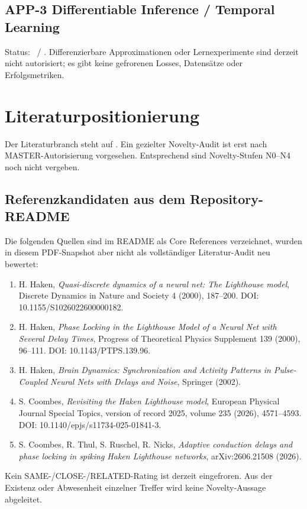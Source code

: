 \documentclass[11pt,a4paper]{article}
\newcommand{\status}[2]{\tcbox[on line,boxrule=0pt,arc=1.5pt,left=4pt,right=4pt,top=2pt,bottom=2pt,colback=#2!12,coltext=#2,fontupper=\bfseries\footnotesize]{#1}}
\newcommand{\WAIT}{\status{WAIT}{graydark}}
\newcommand{\PROTECTED}{\status{PROTECTED}{purple}}
\begin{document}
\subsection{APP-3 Differentiable Inference / Temporal Learning}
Status: \PROTECTED\ / \WAIT. Differenzierbare Approximationen oder Lernexperimente sind derzeit nicht autorisiert; es gibt keine gefrorenen Losses, Datensätze oder Erfolgsmetriken.

\section{Literaturpositionierung}

Der Literaturbranch steht auf \WAIT. Ein gezielter Novelty-Audit ist erst nach MASTER-Autorisierung vorgesehen. Entsprechend sind Novelty-Stufen N0--N4 noch nicht vergeben.

\subsection{Referenzkandidaten aus dem Repository-README}
Die folgenden Quellen sind im README als Core References verzeichnet, wurden in diesem PDF-Snapshot aber nicht als vollständiger Literatur-Audit neu bewertet:
\begin{enumerate}
\item H. Haken, \textit{Quasi-discrete dynamics of a neural net: The Lighthouse model}, Discrete Dynamics in Nature and Society 4 (2000), 187--200. DOI: 10.1155/S1026022600000182.
\item H. Haken, \textit{Phase Locking in the Lighthouse Model of a Neural Net with Several Delay Times}, Progress of Theoretical Physics Supplement 139 (2000), 96--111. DOI: 10.1143/PTPS.139.96.
\item H. Haken, \textit{Brain Dynamics: Synchronization and Activity Patterns in Pulse-Coupled Neural Nets with Delays and Noise}, Springer (2002).
\item S. Coombes, \textit{Revisiting the Haken Lighthouse model}, European Physical Journal Special Topics, version of record 2025, volume 235 (2026), 4571--4593. DOI: 10.1140/epjs/s11734-025-01841-3.
\item S. Coombes, R. Thul, S. Ruschel, R. Nicks, \textit{Adaptive conduction delays and phase locking in spiking Haken Lighthouse networks}, arXiv:2606.21508 (2026).
\end{enumerate}

\begin{warningbox}
Kein SAME-/CLOSE-/RELATED-Rating ist derzeit eingefroren. Aus der Existenz oder Abwesenheit einzelner Treffer wird keine Novelty-Aussage abgeleitet.
\end{warningbox}
\end{document}

